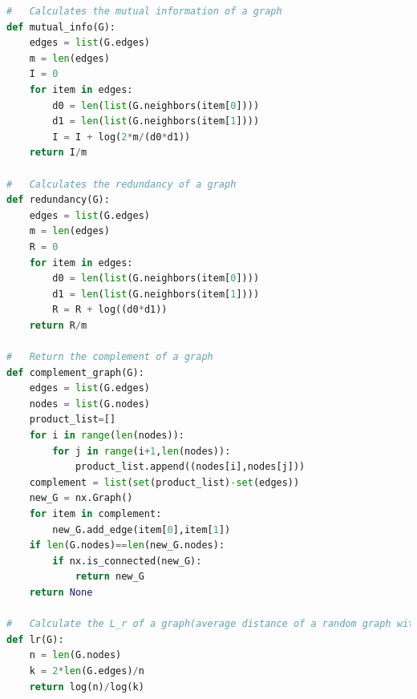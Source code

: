 \documentclass[12pt]{article}
\begin{document}
\begin{lstlisting}[language=Python,breaklines=true]
#   Calculates the mutual information of a graph
def mutual_info(G):
    edges = list(G.edges)
    m = len(edges)
    I = 0
    for item in edges:
        d0 = len(list(G.neighbors(item[0])))
        d1 = len(list(G.neighbors(item[1]))) 
        I = I + log(2*m/(d0*d1))
    return I/m

#   Calculates the redundancy of a graph
def redundancy(G):
    edges = list(G.edges)
    m = len(edges)
    R = 0
    for item in edges:
        d0 = len(list(G.neighbors(item[0])))
        d1 = len(list(G.neighbors(item[1]))) 
        R = R + log((d0*d1))
    return R/m

#   Return the complement of a graph
def complement_graph(G):
    edges = list(G.edges)
    nodes = list(G.nodes)
    product_list=[]
    for i in range(len(nodes)):
        for j in range(i+1,len(nodes)):
            product_list.append((nodes[i],nodes[j]))
    complement = list(set(product_list)-set(edges))
    new_G = nx.Graph()
    for item in complement:
        new_G.add_edge(item[0],item[1])
    if len(G.nodes)==len(new_G.nodes):
        if nx.is_connected(new_G):
            return new_G
    return None

#   Calculate the L_r of a graph(average distance of a random graph with given m and n)
def lr(G):
    n = len(G.nodes)
    k = 2*len(G.edges)/n
    return log(n)/log(k)
\end{lstlisting}
\end{document}
